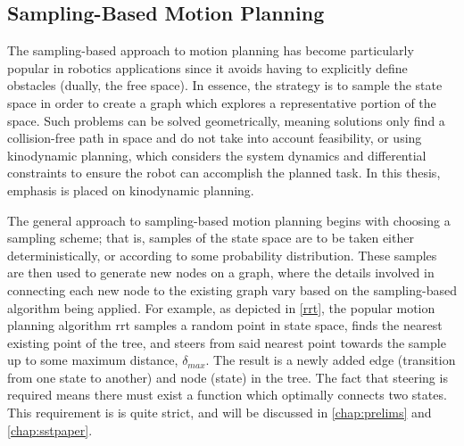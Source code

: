 
\subsection{Sampling-Based Motion Planning}\label{intro:sbmp}

The sampling-based approach to motion planning has become particularly popular in robotics applications since it avoids having to explicitly define obstacles (dually, the free space). In essence, the strategy is to sample the state space in order to create a graph which explores a representative portion of the space. Such problems can be solved geometrically, meaning solutions only find a collision-free path in space and do not take into account feasibility, or using kinodynamic planning, which considers the system dynamics and differential constraints to ensure the robot can accomplish the planned task. In this thesis, emphasis is placed on kinodynamic planning.

The general approach to sampling-based motion planning begins with choosing a sampling scheme; that is, samples of the state space are to be taken either deterministically, or according to some probability distribution. These samples are then used to generate new nodes on a graph, where the details involved in connecting each new node to the existing graph vary based on the sampling-based algorithm being applied. For example, as depicted in \autoref{rrt}, the popular motion planning algorithm \gls{rrt} samples a random point in state space, finds the nearest existing point of the tree, and steers from said nearest point towards the sample up to some maximum distance, $\delta_{max}$. The result is a newly added edge (transition from one state to another) and node (state) in the tree. The fact that steering is required means there must exist a function which optimally connects two states. This requirement is is quite strict, and will be discussed in \autoref{chap:prelims} and \autoref{chap:sstpaper}.

